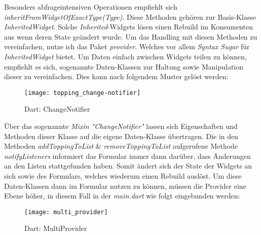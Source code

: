 Besonders abfrageintensiven Operationen empfiehlt
sich \textit{inheritFromWidgetOfExactType(Type)}.
Diese Methoden gehören zur Basis-Klasse \textit{InheritedWidget}.
Solche \textit{Inherited}-Widgets lösen einen Rebuild im Konsumenten
aus wenn deren State geändert wurde.
Um das Handling mit diesen Methoden zu vereinfachen,
nutze ich das Paket \textit{provider}. Welches vor allem
\textit{Syntax Sugar} für \textit{InheritedWidget} bietet.
Um Daten einfach zwischen Widgets teilen zu können,
empfiehlt es sich, sogenannte Daten-Klassen zur
Haltung sowie Manipulation dieser zu vereinfachen.
Dies kann nach folgendem Muster gelöst werden:

\begin{figure}[H]
    \centering
    \texttt{[image: topping\_change-notifier]}
    \caption{Dart: ChangeNotifier}
\end{figure}

Über das sogenannte \textit{Mixin "ChangeNotifier"} lassen
sich Eigenschaften und Methoden dieser Klasse auf die eigene Daten-Klasse
übertragen. Die in den Methoden \textit{addToppingToList} \& \textit{removeToppingToList}
aufgerufene Methode \textit{notifyListeners} informiert das Formular immer dann darüber,
dass Änderungen an den Listen stattgefunden haben.
Somit ändert sich der State der Widgets an sich sowie des Formulars, welches wiederum
einen Rebuild auslöst.
Um diese Daten-Klassen dann im Formular nutzen zu können,
müssen die Provider eine Ebene höher, in diesem Fall in der \textit{main.dart}
wie folgt eingebunden werden:

\begin{figure}[H]
    \centering
    \texttt{[image: multi\_provider]}
    \caption{Dart: MultiProvider}
\end{figure}

\newpage

